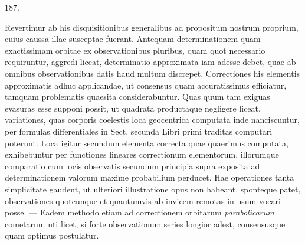 \begin{center}\hypertarget{native-260-article187}{}187.\end{center}
Revertimur ab his disquisitionibus generalibus ad propositum nostrum proprium,
cuius caussa illae susceptae fuerant. Antequam determinationem quam
exactissimam orbitae ex observationibus pluribus, quam quot necessario requiruntur,
aggredi liceat, determinatio approximata iam adesse debet, quae ab
omnibus observationibus datis haud multum discrepet. Correctiones his elementis
approximatis adhuc applicandae, ut consensus quam accuratissimus
efficiatur, tamquam problematis quaesita considerabuntur. Quas quum tam
exiguas evasuras esse supponi possit, ut quadrata productaque negligere liceat,
variationes, quas corporis coelestis loca geocentrica computata inde nanciscuntur,
per formulas differentiales in Sect. secunda Libri primi traditas computari poterunt.
Loca igitur secundum elementa correcta quae quaerimus computata, exhibebuntur
per functiones lineares correctionum elementorum, illorumque comparatio
cum locis observatis secundum principia supra exposita ad determinationem
valorum maxime probabilium perducet. Hae operationes tanta simplicitate
gaudent, ut ulteriori illustratione opus non habeant, sponteque patet, observationes
quotcunque et quantumvis ab invicem remotas in usum vocari posse. --- Eadem
methodo etiam ad correctionem orbitarum \emph{parabolicarum} cometarum uti licet,
si forte observationum series longior adest, consensusque quam optimus postulatur.
